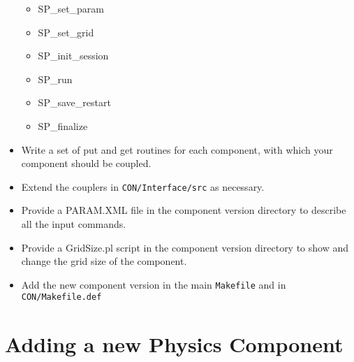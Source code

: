 \begin{itemize}
\begin{itemize}
\item SP\_set\_param
\item SP\_set\_grid
\item SP\_init\_session
\item SP\_run
\item SP\_save\_restart
\item SP\_finalize
\end{itemize}

\item Write a set of put and get routines for each component, 
      with which your component should be coupled.

\item Extend the couplers in {\tt CON/Interface/src} as necessary.

\item Provide a PARAM.XML file in the component version directory
      to describe all the input commands.

\item Provide a GridSize.pl script in the component version directory
      to show and change the grid size of the component.

\item Add the new component version in the main {\tt Makefile} and
      in {\tt CON/Makefile.def}

\end{itemize}

\section{Adding a new Physics Component}

